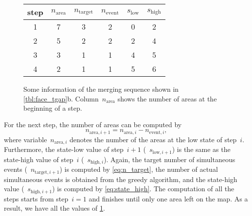 \documentclass[twocolumn]{svjour3}          %
\begin{document}
\begin{figure}[h]
\captionsetup*{type=table}
\caption{Some information of the merging sequence 
shown in \tabl\ref{tbl:face_tgap}b.
Column~$n_\mathrm{area}$ shows the number of areas
at the beginning of a step.
}
\label{tbl:sequence_greedy}
\centering
\begin{tabular}{cccccc}
\toprule
step & $n_\mathrm{area}$ & $n_\mathrm{target}$ 
& $n_\mathrm{event}$ & $s_\mathrm{low}$ & $s_\mathrm{high}$ \\ \midrule
1        & 7      & 3        & 2        & 0      & 2      \\
2        & 5      & 2        & 2        & 2      & 4      \\
3        & 3      & 1        & 1        & 4      & 5      \\
4        & 2      & 1        & 1        & 5      & 6      \\
\bottomrule
\end{tabular}
\end{figure}

For the next step, the number of areas can be computed by
$$
n_{\mathrm{area},i+1} = n_{\mathrm{area},i} - n_{\mathrm{event},i},
$$
where variable~$n_{\mathrm{area},i}$ denotes the number of the areas
at the low state of step~$i$.
Furthermore, the state-low value of step~$i+1$ 
(\ie~$s_{\mathrm{low},i+1}$) 
is the same as the state-high value of step~$i$ 
(\ie~$s_{\mathrm{high},i}$).
Again, the target number of simultaneous events 
(\ie~$n_{\mathrm{target},i+1}$)
is computed by \eq\ref{eq:n_target},
the number of actual simultaneous events 
is obtained from the greedy algorithm,
and the state-high value (\ie~$s_{\mathrm{high},i+1}$) 
is computed by \eq\ref{eq:state_high}.
The computation of all the steps starts from step~$i=1$ and 
finishes until only one area left on the map.
As a result, we have all the values of \tabl\ref{tbl:sequence_greedy}.


\end{document}

